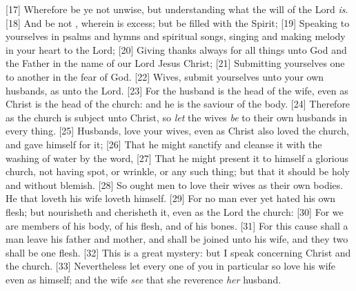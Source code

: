 [17] \textcolor[cmyk]{0.99998,1,0,0}{Wherefore be ye not unwise, but understanding what the will of the Lord \emph{is}.}
[18] \textcolor[cmyk]{0.99998,1,0,0}{And be not , wherein is excess; but be filled with the Spirit;}
[19] \textcolor[cmyk]{0.99998,1,0,0}{Speaking to yourselves in psalms and hymns and spiritual songs, singing and making melody in your heart to the Lord;}
[20] \textcolor[cmyk]{0.99998,1,0,0}{Giving thanks always for all things unto God and the Father in the name of our Lord Jesus Christ;}
[21] \textcolor[cmyk]{0.99998,1,0,0}{Submitting yourselves one to another in the fear of God.}
[22] \textcolor[cmyk]{0.99998,1,0,0}{Wives, submit yourselves unto your own husbands, as unto the Lord.}
[23] \textcolor[cmyk]{0.99998,1,0,0}{For the husband is the head of the wife, even as Christ is the head of the church: and he is the saviour of the body.}
[24] \textcolor[cmyk]{0.99998,1,0,0}{Therefore as the church is subject unto Christ, so \emph{let} the wives \emph{be} to their own husbands in every thing.}
[25] \textcolor[cmyk]{0.99998,1,0,0}{Husbands, love your wives, even as Christ also loved the church, and gave himself for it;}
[26] \textcolor[cmyk]{0.99998,1,0,0}{That he might sanctify and cleanse it with the washing of water by the word,}
[27] \textcolor[cmyk]{0.99998,1,0,0}{That he might present it to himself a glorious church, not having spot, or wrinkle, or any such thing; but that it should be holy and without blemish.}
[28] \textcolor[cmyk]{0.99998,1,0,0}{So ought men to love their wives as their own bodies. He that loveth his wife loveth himself.}
[29] \textcolor[cmyk]{0.99998,1,0,0}{For no man ever yet hated his own flesh; but nourisheth and cherisheth it, even as the Lord the church:}
[30] \textcolor[cmyk]{0.99998,1,0,0}{For we are members of his body, of his flesh, and of his bones.}
[31] \textcolor[cmyk]{0.99998,1,0,0}{For this cause shall a man leave his father and mother, and shall be joined unto his wife, and they two shall be one flesh.}
[32] \textcolor[cmyk]{0.99998,1,0,0}{This is a great mystery: but I speak concerning Christ and the church.}
[33] \textcolor[cmyk]{0.99998,1,0,0}{Nevertheless let every one of you in particular so love his wife even as himself; and the wife \emph{see} that she reverence \emph{her} husband.}